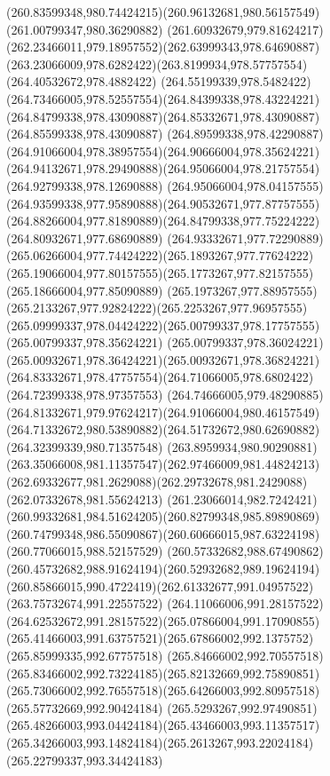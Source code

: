 {{		\curveto(260.83599348,980.74424215)(260.96132681,980.56157549)(261.00799347,980.36290882)
		\curveto(261.60932679,979.81624217)(262.23466011,979.18957552)(262.63999343,978.64690887)
		\curveto(263.23066009,978.6282422)(263.8199934,978.57757554)(264.40532672,978.4882422)
		\curveto(264.55199339,978.5482422)(264.73466005,978.52557554)(264.84399338,978.43224221)
		\curveto(264.84799338,978.43090887)(264.85332671,978.43090887)(264.85599338,978.43090887)
		\curveto(264.89599338,978.42290887)(264.91066004,978.38957554)(264.90666004,978.35624221)
		\curveto(264.94132671,978.29490888)(264.95066004,978.21757554)(264.92799338,978.12690888)
		\curveto(264.95066004,978.04157555)(264.93599338,977.95890888)(264.90532671,977.87757555)
		\curveto(264.88266004,977.81890889)(264.84799338,977.75224222)(264.80932671,977.68690889)
		\curveto(264.93332671,977.72290889)(265.06266004,977.74424222)(265.1893267,977.77624222)
		\curveto(265.19066004,977.80157555)(265.1773267,977.82157555)(265.18666004,977.85090889)
		\curveto(265.1973267,977.88957555)(265.2133267,977.92824222)(265.2253267,977.96957555)
		\curveto(265.09999337,978.04424222)(265.00799337,978.17757555)(265.00799337,978.35624221)
		\curveto(265.00799337,978.36024221)(265.00932671,978.36424221)(265.00932671,978.36824221)
		\curveto(264.83332671,978.47757554)(264.71066005,978.6802422)(264.72399338,978.97357553)
		\curveto(264.74666005,979.48290885)(264.81332671,979.97624217)(264.91066004,980.46157549)
		\curveto(264.71332672,980.53890882)(264.51732672,980.62690882)(264.32399339,980.71357548)
		\curveto(263.8959934,980.90290881)(263.35066008,981.11357547)(262.97466009,981.44824213)
		\curveto(262.69332677,981.2629088)(262.29732678,981.2429088)(262.07332678,981.55624213)
		\curveto(261.23066014,982.7242421)(260.99332681,984.51624205)(260.82799348,985.89890869)
		\curveto(260.74799348,986.55090867)(260.60666015,987.63224198)(260.77066015,988.52157529)
		\curveto(260.57332682,988.67490862)(260.45732682,988.91624194)(260.52932682,989.19624194)
		\curveto(260.85866015,990.4722419)(262.61332677,991.04957522)(263.75732674,991.22557522)
		\curveto(264.11066006,991.28157522)(264.62532672,991.28157522)(265.07866004,991.17090855)
		\curveto(265.41466003,991.63757521)(265.67866002,992.1375752)(265.85999335,992.67757518)
		\curveto(265.84666002,992.70557518)(265.83466002,992.73224185)(265.82132669,992.75890851)
		\curveto(265.73066002,992.76557518)(265.64266003,992.80957518)(265.57732669,992.90424184)
		\curveto(265.5293267,992.97490851)(265.48266003,993.04424184)(265.43466003,993.11357517)
		\curveto(265.34266003,993.14824184)(265.2613267,993.22024184)(265.22799337,993.34424183)
}}
